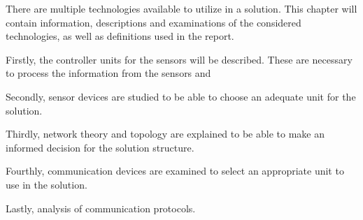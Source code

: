 There are multiple technologies available to utilize in a solution. This chapter will contain information, descriptions and examinations of the considered technologies, as well as definitions used in the report.

Firstly, the controller units for the sensors will be described. These are necessary to process the information from the sensors and 

Secondly, sensor devices are studied to be able to choose an adequate unit for the solution.

Thirdly, network theory and topology are explained to be able to make an informed decision for the solution structure. 

Fourthly, communication devices are examined to select an appropriate unit to use in the solution. 

Lastly, analysis of communication protocols.










